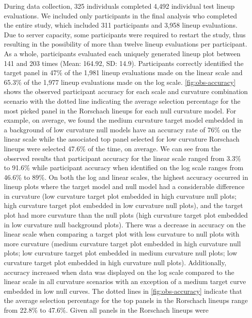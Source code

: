 \documentclass[12pt]{article}
\begin{document}
During data collection, 325 individuals completed 4,492 individual test
lineup evaluations. We included only participants in the final analysis
who completed the entire study, which included 311 participants and
3,958 lineup evaluations. Due to server capacity, some participants were
required to restart the study, thus resulting in the possibility of more
than twelve lineup evaluations per participant. As a whole, participants
evaluated each uniquely generated lineup plot between 141 and 203 times
(Mean: 164.92, SD: 14.9). Participants correctly identified the target
panel in 47\% of the 1,981 lineup evaluations made on the linear scale
and 65.3\% of the 1,977 lineup evaluations made on the log scale.
\cref{fig:obs-accuracy} shows the observed participant accuracy for each
scale and curvature combination scenario with the dotted line indicating
the average selection percentage for the most picked panel in the
Rorschach lineups for each null curvature model. For example, on
average, we found the medium curvature target model embedded in a
background of low curvature null models have an accuracy rate of 76\% on
the linear scale while the associated top panel selected for low
curvature Rorschach lineups were selected 47.6\% of the time, on
average. We can see from the observed results that participant accuracy
for the linear scale ranged from 3.3\% to 91.6\% while participant
accuracy when identified on the log scale ranges from 46.6\% to 89\%. On
both the log and linear scales, the highest accuracy occurred in lineup
plots where the target model and null model had a considerable
difference in curvature (low curvature target plot embedded in high
curvature null plots; high curvature target plot embedded in low
curvature null plots), and the target plot had more curvature than the
null plots (high curvature target plot embedded in low curvature null
background plots). There was a decrease in accuracy on the linear scale
when comparing a target plot with less curvature to null plots with more
curvature (medium curvature target plot embedded in high curvature null
plots; low curvature target plot embedded in medium curvature null
plots; low curvature target plot embedded in high curvature null plots).
Additionally, accuracy increased when data was displayed on the log
scale compared to the linear scale in all curvature scenarios with an
exception of a medium target curve embedded in low null curves. The
dotted lines in \cref{fig:obs-accuracy} indicate that the average
selection percentage for the top panels in the Rorschach lineups range
from 22.8\% to 47.6\%. Given all panels in the Rorschach lineups were
\end{document}
